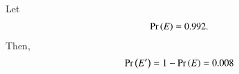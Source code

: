 Let 
\begin{align}
	\label{eq:ncert/10/15/1/7/1}
	\pr{E} = 0.992. 
\end{align}
Then,
\begin{align}
	\Pr\left(E^\prime\right) =1-\Pr\left(E\right)
                = 0.008 
\end{align}



